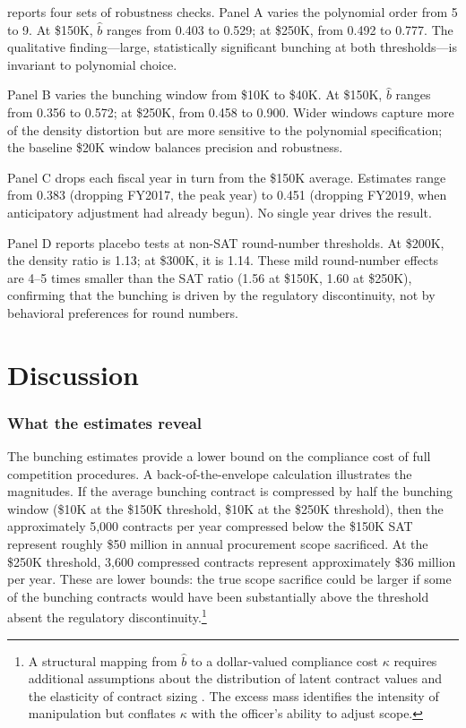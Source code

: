 \documentclass[12pt]{article}
\begin{document}
 reports four sets of robustness checks. Panel A varies the polynomial order from 5 to 9. At \$150K, $\hat{b}$ ranges from 0.403 to 0.529; at \$250K, from 0.492 to 0.777. The qualitative finding---large, statistically significant bunching at both thresholds---is invariant to polynomial choice.

Panel B varies the bunching window from \$10K to \$40K. At \$150K, $\hat{b}$ ranges from 0.356 to 0.572; at \$250K, from 0.458 to 0.900. Wider windows capture more of the density distortion but are more sensitive to the polynomial specification; the baseline \$20K window balances precision and robustness.

Panel C drops each fiscal year in turn from the \$150K average. Estimates range from 0.383 (dropping FY2017, the peak year) to 0.451 (dropping FY2019, when anticipatory adjustment had already begun). No single year drives the result.

Panel D reports placebo tests at non-SAT round-number thresholds. At \$200K, the density ratio is 1.13; at \$300K, it is 1.14. These mild round-number effects are 4--5 times smaller than the SAT ratio (1.56 at \$150K, 1.60 at \$250K), confirming that the bunching is driven by the regulatory discontinuity, not by behavioral preferences for round numbers.



\section{Discussion}

\subsubsection*{What the estimates reveal} The bunching estimates provide a lower bound on the compliance cost of full competition procedures. A back-of-the-envelope calculation illustrates the magnitudes. If the average bunching contract is compressed by half the bunching window (\$10K at the \$150K threshold, \$10K at the \$250K threshold), then the approximately 5,000 contracts per year compressed below the \$150K SAT represent roughly \$50 million in annual procurement scope sacrificed. At the \$250K threshold, 3,600 compressed contracts represent approximately \$36 million per year. These are lower bounds: the true scope sacrifice could be larger if some of the bunching contracts would have been substantially above the threshold absent the regulatory discontinuity.\footnote{A structural mapping from $\hat{b}$ to a dollar-valued compliance cost $\kappa$ requires additional assumptions about the distribution of latent contract values and the elasticity of contract sizing \citep{kleven2016}. The excess mass identifies the intensity of manipulation but conflates $\kappa$ with the officer's ability to adjust scope.}
\end{document}
